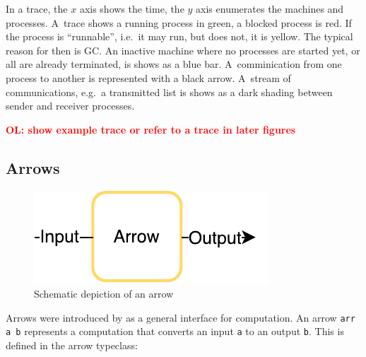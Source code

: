 \documentclass{jfp1}
\newcommand{\inlinecode}[1]{\texttt{#1}}
\newcommand{\comm}[2]{\textcolor{red}{\bfseries #1: #2}}
\newcommand{\olcomment}[1]{\comm{OL}{#1}}
\DeclareRobustCommand{\hairspn}{\hspace{1pt}\nolinebreak}%
\DeclareRobustCommand{\ie}{{i.\hairspn{}e.~}}
\DeclareRobustCommand{\eg}{{e.\hairspn{}g.~}}
\begin{document}
In a trace, the $x$ axis shows the time, the $y$ axis enumerates the machines and processes. A~trace shows a running process in green, a blocked process is red. If the process is \enquote{runnable}, \ie it may run, but does not, it is yellow. The typical reason for then is GC. An inactive machine where no processes are started yet, or all are already terminated, is shows as a blue bar. A~comminication from one process to another is represented with a black arrow. A~stream of communications, \eg a transmitted list is shows as a dark shading between sender and receiver processes.

\olcomment{show example trace or refer to a trace in later figures}


	\subsection{Arrows}
\label{sec:arrows}
\begin{figure}[h]
	\includegraphics{images/arrow}
	\caption{Schematic depiction of an arrow}
\end{figure}
Arrows were introduced by \citet{HughesArrows} as a general interface for computation. An arrow \inlinecode{arr a b} represents  a computation that converts an input \inlinecode{a} to an output \inlinecode{b}. This is defined in the arrow typeclass:
\end{document}
